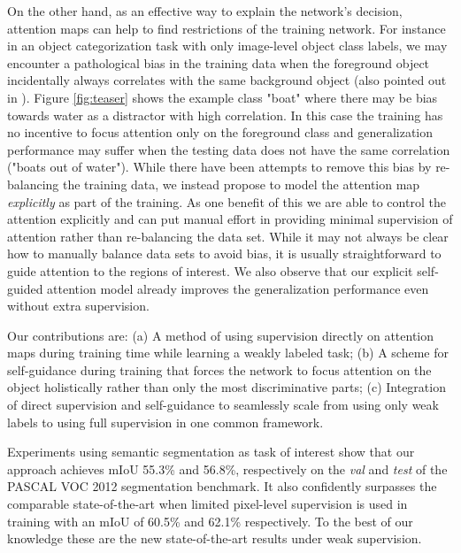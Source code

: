\documentclass[10pt,twocolumn,letterpaper]{article}
\begin{document}
On the other hand, as an effective way to explain the network's decision, attention maps can help to find restrictions of the training network. For instance in an object categorization task with only image-level object class labels, we may encounter a pathological bias in the training data when the foreground object incidentally always correlates with the same background object (also pointed out in \cite{grad-cam}). Figure \ref{fig:teaser} shows the example class "boat" where there may be bias towards water as a distractor with high correlation. In this case the training has no incentive to focus attention only on the foreground class and generalization performance may suffer when the testing data does not have the same correlation ("boats out of water"). While there have been attempts to remove this bias by re-balancing the training data, we instead propose to model the attention map \emph{explicitly} as part of the training. As one benefit of this we are able to control the attention explicitly and can put manual effort in providing minimal supervision of attention rather than re-balancing the data set. While it may not always be clear how to manually balance data sets to avoid bias, it is usually straightforward to guide attention to the regions of interest. We also observe that our explicit self-guided attention model already improves the generalization performance even without extra supervision.

Our contributions are: (a) A method of using supervision directly on attention maps during training time while learning a weakly labeled task; (b) A scheme for self-guidance during training that forces the network to focus attention on the object holistically rather than only the most discriminative parts; (c) Integration of direct supervision and self-guidance to seamlessly scale from using only weak labels to using full supervision in one common framework.


Experiments using semantic segmentation as task of interest show that our approach achieves mIoU 55.3\% and 56.8\%, respectively on the \emph{val} and \emph{test} of the PASCAL VOC 2012 segmentation benchmark. It also confidently surpasses the comparable state-of-the-art when limited pixel-level supervision is used in training with an mIoU of 60.5\% and 62.1\% respectively. To the best of our knowledge these are the new state-of-the-art results under weak supervision.
\end{document}
